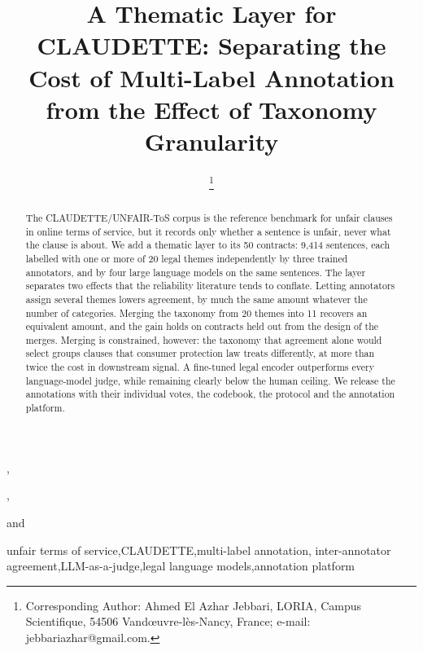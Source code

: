 \documentclass{IOS-Book-Article}     %
\newcommand{\corpus}{CLAUDETTE}      %
\begin{document}
\begin{frontmatter}          %
%
\title{A Thematic Layer for \corpus{}: Separating the Cost of Multi-Label Annotation from the Effect of Taxonomy Granularity}
\runningtitle{A Thematic Layer for \corpus{}}

\author[A]{ %
\thanks{Corresponding Author: Ahmed El Azhar Jebbari, LORIA, Campus Scientifique,
54506 Vand\oe uvre-l\`es-Nancy, France; e-mail: jebbariazhar@gmail.com.}},
\author[A]{ },
\author[B]{ }
and
\author[C]{ }
\address[A]{LORIA, Universit\'e de Lorraine, CNRS, Inria, Nancy, France}
\address[B]{Juristiadata, France}
\address[C]{Faculty of Legal Sciences, Rabat, Morocco}
%
\begin{abstract}
The \corpus{}/UNFAIR-ToS corpus is the reference benchmark for unfair clauses in
online terms of service, but it records only whether a sentence is unfair, never
what the clause is about. We add a thematic layer to its 50 contracts:
9,414 sentences, each labelled with one or more of 20 legal themes independently
by three trained annotators, and by four large language models on the same
sentences. The layer separates two effects that the reliability literature tends
to conflate. Letting annotators assign several themes lowers agreement, by much
the same amount whatever the number of categories. Merging the taxonomy from
20 themes into 11 recovers an equivalent amount, and the gain holds on contracts
held out from the design of the merges. Merging is constrained, however: the
taxonomy that agreement alone would select groups clauses that consumer protection
law treats differently, at more than twice the cost in downstream signal. A
fine-tuned legal encoder outperforms every language-model judge, while remaining
clearly below the human ceiling. We release the annotations with their individual
votes, the codebook, the protocol and the annotation platform.
\end{abstract}

\begin{keyword}
unfair terms of service\sep \corpus{}\sep multi-label annotation\sep
inter-annotator agreement\sep LLM-as-a-judge\sep legal language models\sep annotation platform
\end{keyword}

\end{frontmatter}
\end{document}
